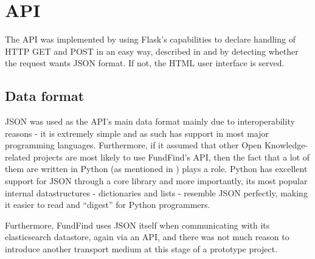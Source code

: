\section{API}
\label{design-api}
%     
%     
%     

The API was implemented by using Flask's capabilities to declare handling of HTTP GET and POST in an easy way, described in  and by detecting whether the request wants JSON format. If not, the HTML user interface is served.

\subsection{Data format}
  JSON was used as the API's main data format mainly due to interoperability reasons - it is extremely simple and as such has support in most major programming languages. Furthermore, if it assumed that other Open Knowledge-related projects are most likely to use FundFind's API, then the fact that a lot of them are written in Python (as mentioned in ) plays a role. Python has excellent support for JSON through a core library and more importantly, its most popular internal datastructures - dictionaries and lists - resemble JSON perfectly, making it easier to read and ``digest'' for Python programmers.
  
  Furthermore, FundFind uses JSON itself when communicating with its elasticsearch datastore, again via an API, and there was not much reason to introduce another transport medium at this stage of a prototype project.
 

